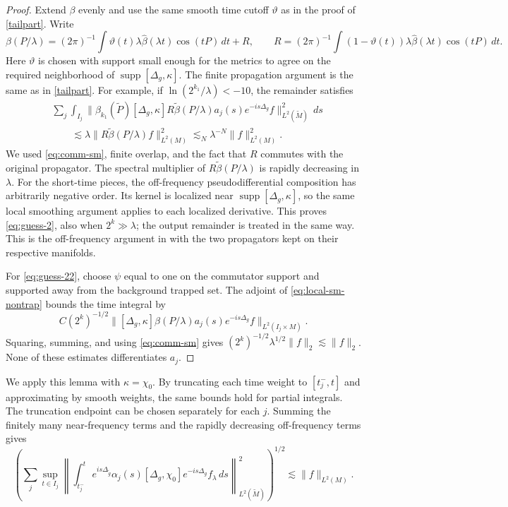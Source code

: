 \documentclass[11pt]{amsart}
\newcommand{\la}{\lambda}
\begin{document}
\begin{proof}
Extend $\beta$ evenly and use the same smooth time cutoff $\vartheta$ as in the proof of \eqref{tailpart}. Write
\[
\beta(P/\la)=(2\pi)^{-1}\int\vartheta(t)\la\widehat\beta(\la t)\cos(tP)\,dt+R,
\qquad
R=(2\pi)^{-1}\int(1-\vartheta(t))\la\widehat\beta(\la t)\cos(tP)\,dt.
\]
Here $\vartheta$ is chosen with support small enough for the metrics to agree on the required neighborhood of $\operatorname{supp}[\Delta_g,\kappa]$. The finite propagation argument is the same as in \eqref{tailpart}. For example, if $\ln(2^{k_1}/\la)<-10$, the remainder satisfies
\begin{equation}\label{goal2}
\begin{split}
&\sum_j\int_{I_j}\|\beta_{k_1}(\tilde P)[\Delta_g,\kappa]R\tilde\beta(P/\la)
a_j(s)e^{-is\Delta_g}f\|_{L^2(\tilde M)}^2\,ds\\
&\qquad\lesssim\la\|R\tilde\beta(P/\la)f\|_{L^2(M)}^2
\lesssim_N\la^{-N}\|f\|_{L^2(M)}^2.
\end{split}
\end{equation}
We used \eqref{eq:comm-sm}, finite overlap, and the fact that $R$ commutes with the original propagator. The spectral multiplier of $R\tilde\beta(P/\la)$ is rapidly decreasing in $\la$. For the short-time pieces, the off-frequency pseudodifferential composition has arbitrarily negative order. Its kernel is localized near $\operatorname{supp}[\Delta_g,\kappa]$, so the same local smoothing argument applies to each localized derivative. This proves \eqref{eq:guess-2}, also when $2^k\gg\la$; the output remainder is treated in the same way. This is the off-frequency argument in \cite[Lemma 2.5]{HSTZ} with the two propagators kept on their respective manifolds.

For \eqref{eq:guess-22}, choose $\psi$ equal to one on the commutator support and supported away from the background trapped set. The adjoint of \eqref{eq:local-sm-nontrap} bounds the time integral by
\[
C(2^k)^{-1/2}\|[\Delta_g,\kappa]\beta(P/\la)a_j(s)e^{-is\Delta_g}f\|_{L^2(I_j\times M)}.
\]
Squaring, summing, and using \eqref{eq:comm-sm} gives $(2^k)^{-1/2}\la^{1/2}\|f\|_2\lesssim\|f\|_2$. None of these estimates differentiates $a_j$.
\end{proof}

We apply this lemma with $\kappa=\chi_0$. By truncating each time weight to $[t_j^-,t]$ and approximating by smooth weights, the same bounds hold for partial integrals. The truncation endpoint can be chosen separately for each $j$. Summing the finitely many near-frequency terms and the rapidly decreasing off-frequency terms gives
\begin{equation}\label{eq:global-stri-diag}
\left(\sum_j\sup_{t\in I_j}\left\|\int_{t_j^-}^t
e^{is\Delta_{\tilde g}}\alpha_j(s)[\Delta_g,\chi_0]e^{-is\Delta_g}f_\la\,ds
\right\|_{L^2(\tilde M)}^2\right)^{1/2}
\lesssim\|f\|_{L^2(M)}.
\end{equation}
\end{document}

